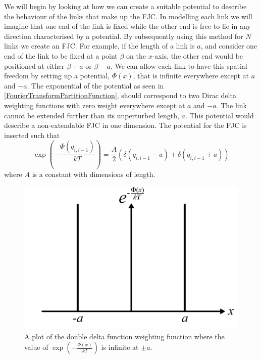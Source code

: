 We will begin by looking at how we can create a suitable potential to describe the behaviour of the links that make up the FJC. In modelling each link we will imagine that one end of the link is fixed while the other end is free to lie in any direction characterised by a potential. By subsequently using this method for $N$ links we create an FJC. For example, if the length of a link is $a$, and consider one end of the link to be fixed at a point $\beta$ on the $x$-axis, the other end would be positioned at either $\beta+a$ or $\beta-a$. We can allow each link to have this spatial freedom by setting up a potential, $\Phi\left(x\right)$, that is infinite everywhere except at $a$ and $-a$. The exponential of the potential as seen in \eqref{FourierTransformPartitionFunction}, should correspond to two Dirac delta weighting functions with zero weight everywhere except at $a$ and $-a$. The link cannot be extended further than its unperturbed length, $a$. This potential would describe a non-extendable FJC in one dimension. The potential for the FJC is inserted such that
%
\begin{equation}\label{tophatdeltapotential}
\exp\left(-\frac{\Phi\left(q_{i,i-1}\right)}{kT} \right) = \frac{A}{2}\left( \delta\left(q_{i,i-1}-a\right) + \delta\left(q_{i,i-1}+a\right)  \right)
\end{equation}
%
where $A$ is a constant with dimensions of length. 
%
\begin{figure}[H]
\centering \includegraphics[scale=0.6]{Graphics/DoubleDeltaFunction.png} 
\caption{A plot of the double delta function weighting function where the value of $\exp\left(-\frac{\Phi\left(x\right)}{kT}\right)$ is infinite at $\pm a$.}
\label{fig:DoubleDeltaFunctionPotential} 
\end{figure}
